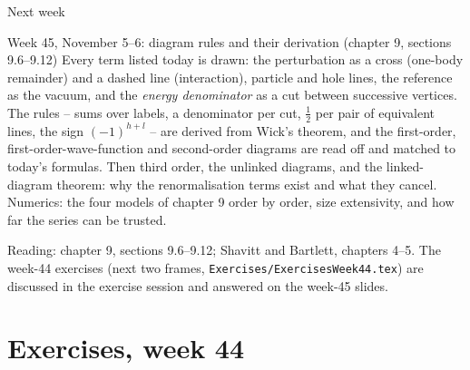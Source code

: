 \documentclass[aspectratio=169,10pt]{beamer}
\begin{document}
\begin{frame}{Next week}
  \begin{exampleblock}{Week 45, November 5--6: diagram rules and their derivation (chapter 9, sections 9.6--9.12)}
    \small
    Every term listed today is drawn: the perturbation as a cross (one-body remainder) and a dashed line (interaction), particle and hole lines, the reference as the vacuum, and the \emph{energy denominator} as a cut between successive vertices. The rules -- sums over labels, a denominator per cut, \(\tfrac12\) per pair of equivalent lines, the sign \((-1)^{h+l}\) -- are derived from Wick's theorem, and the first-order, first-order-wave-function and second-order diagrams are read off and matched to today's formulas. Then third order, the unlinked diagrams, and the linked-diagram theorem: why the renormalisation terms exist and what they cancel. Numerics: the four models of chapter 9 order by order, size extensivity, and how far the series can be trusted.
  \end{exampleblock}
  \vspace{0.5em}
  \small
  Reading: chapter 9, sections 9.6--9.12; Shavitt and Bartlett, chapters 4--5. The week-44 exercises (next two frames, \texttt{Exercises/ExercisesWeek44.tex}) are discussed in the exercise session and answered on the week-45 slides.
\end{frame}

\section{Exercises, week 44}
\end{document}
